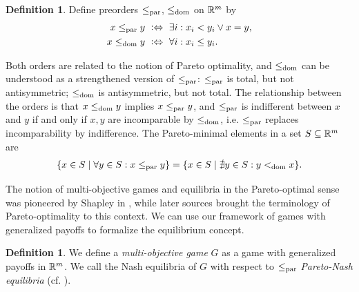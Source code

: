 \documentclass[a4paper]{scrreprt}
\theoremstyle{definition}
\newtheorem{defn}[thm]{Definition} %
\begin{document}
    \begin{defn}
        Define preorders $\leq_{\text{par}}$, $\leq_{\text{dom}}$ on $\mathbb{R}^m$ by
        \begin{align*}
        	x \leq_{\text{par}} y ~ & \mathrel{\vcentcolon\Leftrightarrow}~ \exists i: x_i < y_i \vee x = y, \\
        	x \leq_{\text{dom}} y ~    & \mathrel{\vcentcolon\Leftrightarrow}~ \forall i: x_i \leq y_i.
        \end{align*}
    \end{defn}
    Both orders are related to the notion of Pareto optimality, and $\leq_{\text{dom}}$ can be understood as a strengthened version of $\leq_{\text{par}}$:
    $\leq_{\text{par}}$ is total, but not antisymmetric; $\leq_{\text{dom}}$ is antisymmetric, but not total.
    The relationship between the orders is that $x \leq_{\text{dom}} y$ implies $x \leq_{\text{par}} y$,
    and $\leq_{\text{par}}$ is indifferent between $x$ and $y$ if and only if $x, y$ are incomparable by $\leq_{\text{dom}}$, i.e. $\leq_{\text{par}}$ replaces incomparability by indifference.
    The Pareto-minimal elements in a set $S \subseteq \mathbb{R}^m$ are
    \begin{gather*}
        \{x \in S \mid \forall y \in S: x \leq_{\text{par}} y\} = \{x \in S \mid \nexists y \in S: y <_{\text{dom}} x\}.
    \end{gather*}    
    
    The notion of multi-objective games and equilibria in the Pareto-optimal sense was pioneered by Shapley in \cite{bib:shapleyMultiobjectiveEquilibriumPoints},
    while later sources brought the terminology of Pareto-optimality to this context. %
    We can use our framework of games with generalized payoffs to formalize the equilibrium concept.
    
    \begin{defn}
        We define a \emph{multi-objective game} $G$ as a game with generalized payoffs in $\mathbb{R}^m$.
        We call the Nash equilibria of $G$ with respect to $\leq_{\text{par}}$ \emph{Pareto-Nash equilibria} (cf. \cite{bib:paretoNashEquilibria}).
    \end{defn}
\end{document}
